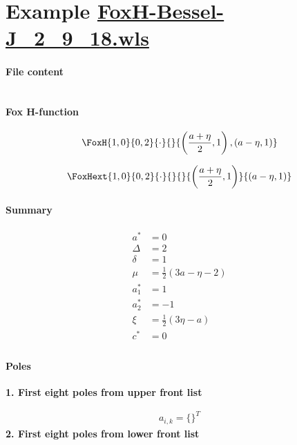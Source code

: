 \documentclass[11pt]{article}
\begin{document}
\section{Example \url{FoxH-Bessel-J_2_9_18.wls}}

\paragraph{File content}

\inputminted{text}{FoxH-Bessel-J_2_9_18.wls}

\paragraph{Fox H-function}

\begin{align*}
  \FoxH
    {1,0}
    {0,2}
    {\cdot}
    {}
    {\left(\frac{a+\eta }{2}, 1\right), \left(a-\eta, 1\right)}
\end{align*}

\begin{align*}
  \FoxHext
    {1,0}
    {0,2}
    {\cdot}
    {}
    {}
    {\left(\frac{a+\eta }{2}, 1\right)}
    {\left(a-\eta, 1\right)}
\end{align*}

\paragraph{Summary}

\begin{align*}
  a^*    & = 0 \\
  \Delta & = 2 \\
  \delta & = 1 \\
  \mu    & = \frac{1}{2} (3 a-\eta -2) \\
  a_1^*  & = 1 \\
  a_2^*  & = -1 \\
  \xi    & = \frac{1}{2} (3 \eta -a) \\
  c^*    & = 0 \\
\end{align*}

\paragraph{Poles}

\noindent\textbf{1. First eight poles from upper front list}

\begin{align*}
  a_{i,k} = 
  \{\}^T 
\end{align*}
\noindent\textbf{2. First eight poles from lower front list}
\end{document}
